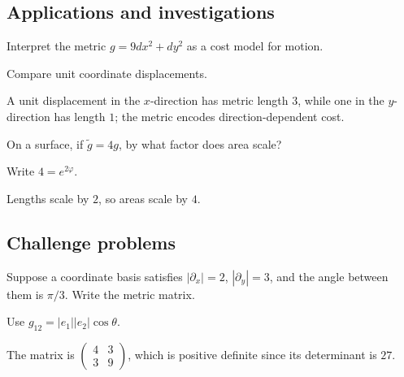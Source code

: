 \subsection*{Applications and investigations}

\begin{exercise}\label{exr:vii20-ped-13}
Interpret the metric \(g=9dx^2+dy^2\) as a cost model for motion.
\end{exercise}

\begin{hint}
Compare unit coordinate displacements.
\end{hint}

\begin{solution}
A unit displacement in the \(x\)-direction has metric length \(3\), while one in the \(y\)-direction has length \(1\); the metric encodes direction-dependent cost.
\end{solution}

\begin{exercise}\label{exr:vii20-ped-14}
On a surface, if \(\widetilde g=4g\), by what factor does area scale?
\end{exercise}

\begin{hint}
Write \(4=e^{2\varphi}\).
\end{hint}

\begin{solution}
Lengths scale by \(2\), so areas scale by \(4\).
\end{solution}

\subsection*{Challenge problems}

\begin{exercise}\label{exr:vii20-ped-15}
Suppose a coordinate basis satisfies \(|\partial_x|=2\), \(|\partial_y|=3\), and the angle between them is \(\pi/3\).  Write the metric matrix.
\end{exercise}

\begin{hint}
Use \(g_{12}=|e_1||e_2|\cos\theta\).
\end{hint}

\begin{solution}
The matrix is \(\begin{pmatrix}4&3\\3&9\end{pmatrix}\), which is positive definite since its determinant is \(27\).
\end{solution}

